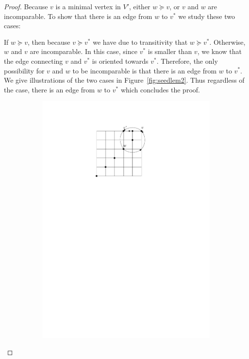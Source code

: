 \documentclass[a4paper,10pt]{article}
\begin{document}
\begin{proof}
   Because $v$ is a minimal vertex in $V'$, either $w\succeq v$, or $v$ and $w$ are incomparable. 
   To show that there is an edge from $w$ to $v^*$ we study these two cases: 
   
If $w \succeq v$, then because $v \succeq v^*$ we have due to transitivity that $w \succeq v^*$. 
  Otherwise, $w$ and $v$ are incomparable. In this case, since $v^*$ is smaller than $v$, we know that the edge connecting $v$ and $v^*$ is  oriented towards $v^*$. Therefore, the only possibility for $v$ and $w$ to be incomparable is that there is an edge from $w$ to $v^*$. We give illustrations of the two cases in Figure~\ref{fig:seedlem2}. Thus regardless of the case, there is an edge from $w$ to $v^*$ which concludes the proof.   
   \begin{figure}[htbp] 
       \centering
       \begin{subfigure}[b]{0.4\textwidth}
           \includegraphics[scale = 0.7]{seedlemma_fig2_cas1.pdf}

\end{subfigure}
\end{figure}
\end{proof}
\end{document}
